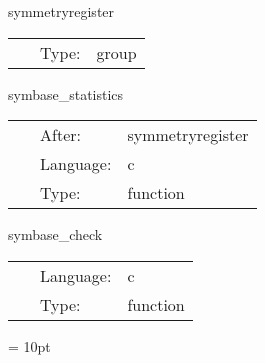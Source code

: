 \vspace{5mm}


\hspace{5mm} symmetryregister 

\hspace{5mm}{\it register your symmetries here } 


\hspace{5mm}

 \begin{tabular*}{160mm}{cll} 
~ & Type:  & group \\ 
\end{tabular*} 


\vspace{5mm}


\hspace{5mm} symbase\_statistics 

\hspace{5mm}{\it print symmetry boundary face descriptions } 


\hspace{5mm}

 \begin{tabular*}{160mm}{cll} 
~ & After:  & symmetryregister \\ 
~ & Language:  & c \\ 
~ & Type:  & function \\ 
\end{tabular*} 


\vspace{5mm}


\hspace{5mm} symbase\_check 

\hspace{5mm}{\it check whether the driver set up the grid consistently } 


\hspace{5mm}

 \begin{tabular*}{160mm}{cll} 
~ & Language:  & c \\ 
~ & Type:  & function \\ 
\end{tabular*} 



\vspace{5mm}\parskip = 10pt 
